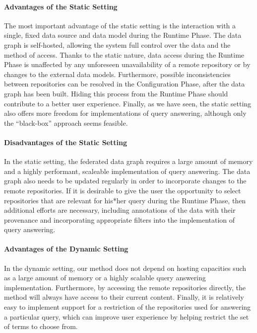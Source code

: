 \paragraph{Advantages of the Static Setting}

The most important advantage of the static setting is the interaction with a single, fixed data source
and data model during the Runtime Phase.
The data graph is self-hosted, allowing the system full control over the data
and the method of access.
Thanks to the static nature, data access during the Runtime Phase is
unaffected by any unforeseen unavailability of a remote repository
or by changes to the external data models.
Furthermore, possible inconsistencies between repositories
can be resolved in the Configuration Phase, after the data graph has been built. Hiding this process from the Runtime Phase
should contribute to a better user experience.
Finally, as we have seen, the static setting also offers more freedom for implementations of
query answering, although only the \enquote{black-box} approach seems feasible.

\paragraph{Disadvantages of the Static Setting}

In the static setting, the federated data graph requires a large amount of memory
and a highly performant, scaleable implementation of query answering.
The data graph also needs to be updated regularly in order to incorporate changes
to the remote repositories.
If it is desirable to give the user the opportunity to select repositories 
that are relevant for his*her query during the Runtime Phase, 
then additional efforts are necessary, including annotations of the data
with their provenance and incorporating appropriate filters into the implementation
of query answering.

\paragraph{Advantages of the Dynamic Setting}

In the dynamic setting, our method does not depend on hosting capacities
such as a large amount of memory or a highly scalable query answering implementation.
Furthermore, by accessing the remote repositories directly,
the method will always have access to their current content.
Finally, it is relatively easy to implement support for 
a restriction of the repositories used for answering a particular query,
which can improve user experience by helping restrict the set of terms to choose from.

